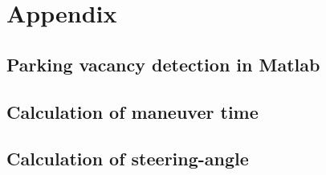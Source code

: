 \chapter{Appendix}
\section{Parking vacancy detection in Matlab}

\newpage
\section{Calculation of maneuver time}


\newpage
\section{Calculation of steering-angle}

